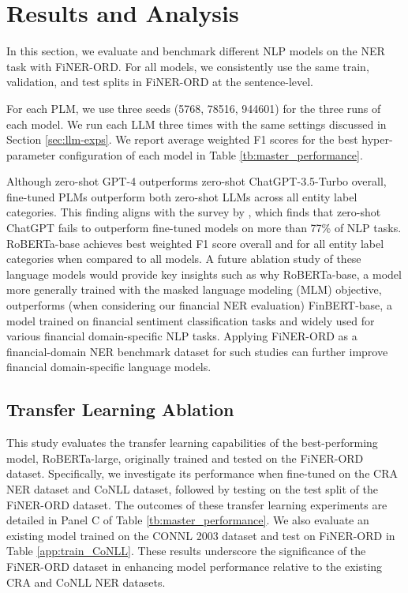 \documentclass[11pt]{article}
\begin{document}
\section{Results and Analysis}
In this section, we evaluate and benchmark different NLP models on the NER task with FiNER-ORD. For all models, we consistently use the same train, validation, and test splits in FiNER-ORD at the sentence-level.

For each PLM, we use three seeds (5768, 78516, 944601) for the three runs of each model. We run each LLM three times with the same settings discussed in Section \ref{sec:llm-exps}. We report average weighted F1 scores for the best hyper-parameter configuration of each model in Table \ref{tb:master_performance}. 

Although zero-shot GPT-4 outperforms zero-shot ChatGPT-3.5-Turbo overall, fine-tuned PLMs outperform both zero-shot LLMs across all entity label categories. This finding aligns with the survey by \citet{pikuliak_chatgpt_survey}, which finds that zero-shot ChatGPT fails to outperform fine-tuned models on more than 77\% of NLP tasks. RoBERTa-base achieves best weighted F1 score overall and for all entity label categories when compared to all models. A future ablation study of these language models would provide key insights such as why RoBERTa-base, a model more generally trained with the masked language modeling (MLM) objective, outperforms (when considering our financial NER evaluation) FinBERT-base, a model trained on financial sentiment classification tasks and widely used for various financial domain-specific NLP tasks. Applying FiNER-ORD as a financial-domain NER benchmark dataset for such studies can further improve financial domain-specific language models.

\subsection{Transfer Learning Ablation}
\label{app:transfer_learning}
This study evaluates the transfer learning capabilities of the best-performing model, RoBERTa-large, originally trained and tested on the FiNER-ORD dataset. Specifically, we investigate its performance when fine-tuned on the CRA NER dataset and CoNLL dataset, followed by testing on the test split of the FiNER-ORD dataset. The outcomes of these transfer learning experiments are detailed in Panel C of Table \ref{tb:master_performance}. We also evaluate an existing model trained on the CONNL 2003 dataset and test on FiNER-ORD in Table \ref{app:train_CoNLL}. These results underscore the significance of the FiNER-ORD dataset in enhancing model performance relative to the existing CRA and CoNLL NER datasets.
\end{document}
